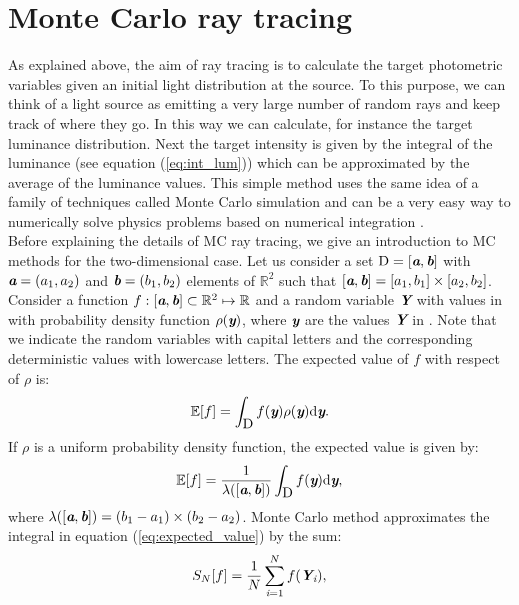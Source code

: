 \section{Monte Carlo ray tracing}
As explained above, the aim of ray tracing is to calculate the target photometric variables given an initial light distribution at the source. To this purpose, we can think of a light source as
emitting a very large number of random rays and keep track of where they go. In this way we can calculate, for instance the target luminance distribution. Next the target intensity is given by the integral of the luminance (see equation (\ref{eq:int_lum})) which can be approximated by the average of the luminance values. This simple method uses the same idea of a family of techniques called Monte Carlo simulation and can be a very easy way to numerically
solve physics problems based on numerical integration \cite{jensen2003monte}.
\\ \indent Before explaining the details of MC ray tracing, we give an introduction to MC methods for the two-dimensional case. Let us consider a set $\mbox{$\textup{D}$} = [\textit{\textbf{a}}, \textit{\textbf{b}}]$ with $\textit{\textbf{a}} = (a_1, a_2)$ and $\textit{\textbf{b}} = (b_1, b_2)$ elements of $\mathbb{R}^2$ such that
$[\textit{\textbf{a}}, \textit{\textbf{b}}]  = [a_1, b_1] \times [a_2, b_2]$. Consider a function $f:[\textit{\textbf{a}},\textit{\textbf{b}}]\subset \mathbb{R}^2 \mapsto \mathbb{R}$ and a random variable $\textit{\textbf{Y}}$ with values in  with probability density function $\rho(\textit{\textbf{y}})$, where $\textit{\textbf{y}}$ are the values $\textit{\textbf{Y}}$ in . Note that we indicate the random variables with capital letters and the corresponding deterministic values with lowercase letters. The expected value of $f$ with respect of $\rho$ is:
\begin{equation}
\mathbb{E}[f] =\int_{\mbox{$\textup{D}$}}f(\textit{\textbf{y}})\rho(\textit{\textbf{y}}) \textrm{d}\textit{\textbf{y}}.
\end{equation}
If $\rho$ is a uniform probability density function, the expected value is given by:
\begin{equation}\label{eq:expected_value}
\mathbb{E}[f] =\frac{1}{\lambda([\textit{\textbf{a}},\textit{\textbf{b}}])} \int_{\mbox{$\textup{D}$}}f(\textit{\textbf{y}}) \textrm{d}\textit{\textbf{y}},
\end{equation}
where $\lambda([\textit{\textbf{a}},\textit{\textbf{b}}]) = (b_1-a_1)\times (b_2-a_2)$.
Monte Carlo method approximates the integral in equation (\ref{eq:expected_value}) by the sum:
\begin{equation}
S_{N}[f] = \frac{1}{N} \sum_{\textit{i}=1}^{N} f(\textit{\textbf{Y}}_{\textit{i}}),
\end{equation}
